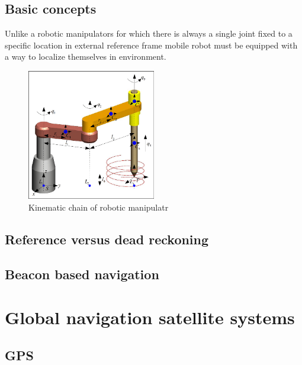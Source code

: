\subsection{Basic concepts}
Unlike a robotic manipulators for which there is always a single joint fixed to a specific
location in external reference frame mobile robot must be equipped with a way to localize
themselves in environment.
\begin{figure}[hb]
	\includegraphics[width=0.5\textwidth]{res/robot_arm_reference}
	\caption{Kinematic chain of robotic manipulatr}
	\label{fig:robot_arm_reference}
\end{figure}


\subsection{Reference versus dead reckoning}

\subsection{Beacon based navigation}


\section{Global navigation satellite systems}

\subsection{GPS}


